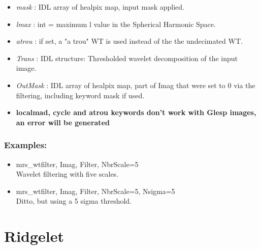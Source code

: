\begin{itemize}
\item {\em mask} : IDL array of healpix map, input mask applied.
\item {\em lmax} : int = maximum l value in the Spherical Harmonic Space.
\item {\em atrou} : if set, a "a trou" WT is used instead of the the undecimated WT.
\item {\em Trans} : IDL structure: Thresholded wavelet decomposition of the input image.
\item {\em OutMask} : IDL array of healpix map, part of Imag that were set to 0 via the filtering, including keyword mask if used.
\item {\bf localmad, cycle and atrou keywords don't work with Glesp images, an error will be generated}
\end{itemize}

\subsubsection*{Examples:} 
\begin{itemize}
\item mrs\_wtfilter, Imag, Filter, NbrScale=5 \\
Wavelet filtering with five scales.
\item mrs\_wtfilter, Imag, Filter, NbrScale=5, Nsigma=5 \\
Ditto, but using a 5 sigma threshold.
\end{itemize}



\section{Ridgelet}

